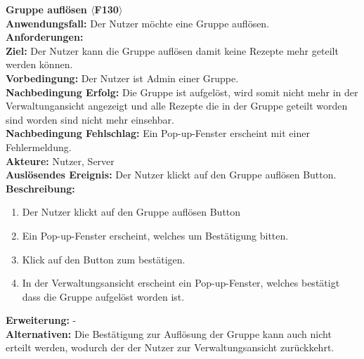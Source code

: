\documentclass[parskip=full]{scrartcl}
\begin{document}
\textbf{Gruppe auflösen $\langle$F130$\rangle$}\\
\textbf{Anwendungsfall:} Der Nutzer möchte eine Gruppe auflösen.\\
\textbf{Anforderungen:} \\
\textbf{Ziel:} Der Nutzer kann die Gruppe auflösen damit keine Rezepte mehr geteilt werden können.\\
\textbf{Vorbedingung:} Der Nutzer ist Admin einer Gruppe.\\
\textbf{Nachbedingung Erfolg:} Die Gruppe ist aufgelöst, wird somit nicht mehr in der Verwaltungansicht angezeigt und alle Rezepte die in der Gruppe geteilt worden sind worden sind nicht mehr einsehbar.\\
\textbf{Nachbedingung Fehlschlag:} Ein Pop-up-Fenster erscheint mit einer Fehlermeldung.\\
\textbf{Akteure:} Nutzer, Server \\
\textbf{Auslösendes Ereignis:} Der Nutzer klickt auf den Gruppe auflösen Button.\\
\textbf{Beschreibung:}
\begin{enumerate}
    \item Der Nutzer klickt auf den Gruppe auflösen Button
    \item Ein Pop-up-Fenster erscheint, welches um Bestätigung bitten.
    \item Klick auf den Button zum bestätigen.
    \item In der Verwaltungsansicht erscheint ein Pop-up-Fenster, welches bestätigt dass die Gruppe aufgelöst worden ist.
\end{enumerate}
\textbf{Erweiterung:} -\\
\textbf{Alternativen:} Die Bestätigung zur Auflösung der Gruppe kann auch nicht erteilt werden, wodurch der der Nutzer zur Verwaltungsansicht zurückkehrt.\\
\newpage
\end{document}
